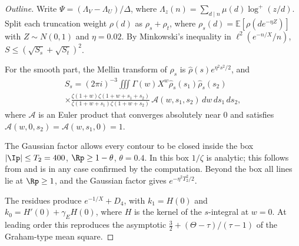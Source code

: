 \begin{proof}[Outline]
Write $\Psi = (\Lambda_V - \Lambda_U)/\Delta$, where $\Lambda_z(n) = \sum_{d\mid n}\mu(d)\log^+(z/d)$.
Split each truncation weight $\rho(d)$ as $\rho_s + \rho_t$, where $\rho_s(d) = \mathbb E[\rho(de^{-\eta Z})]$ with $Z\sim N(0,1)$ and $\eta = 0.02$.
By Minkowski's inequality in $\ell^2(e^{-n/X}/n)$, $S \le (\sqrt{S_s}+\sqrt{S_t})^2$.

For the smooth part, the Mellin transform of $\rho_s$ is $\hat\rho(s)e^{\eta^2s^2/2}$, and
\begin{multline*}
S_s = (2\pi i)^{-3}\iiint\Gamma(w)X^w\hat\rho_s(s_1)\hat\rho_s(s_2)\\ \times\frac{\zeta(1+w)\zeta(1+w+s_1+s_2)}{\zeta(1+w+s_1)\zeta(1+w+s_2)}\,\mathcal A(w,s_1,s_2)\,dw\,ds_1\,ds_2,
\end{multline*}
where $\mathcal A$ is an Euler product that converges absolutely near $0$ and satisfies $\mathcal A(w,0,s_2) = \mathcal A(w,s_1,0) = 1$.

The Gaussian factor allows every contour to be closed inside the box $|\Ip| \le T_2 = 400$, $\Rp \ge 1-\theta$, $\theta = 0.4$.
In this box $1/\zeta$ is analytic; this follows from \cite{PlattTrudgianRH} and is in any case confirmed by the computation.
Beyond the box all lines lie at $\Rp\ge1$, and the Gaussian factor gives $e^{-\eta^2T_2^2/2}$.

The residues produce $e^{-1/X} + D_4$, with $k_1 = H(0)$ and $k_0 = H'(0) + \gamma_EH(0)$, where $H$ is the kernel of the $s$-integral at $w = 0$.
At leading order this reproduces the asymptotic $\frac32 + (\Theta - \tau)/(\tau-1)$ of the Graham-type mean square.


\end{proof}
